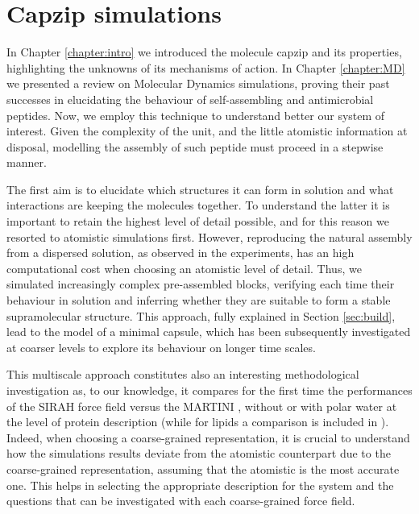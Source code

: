 \chapter{Capzip simulations} \label{chapter:capzip_results}

In Chapter \ref{chapter:intro} we introduced the molecule capzip and its properties, highlighting the unknowns of its mechanisms of action. In Chapter \ref{chapter:MD} we presented a review on Molecular Dynamics simulations, proving their past successes in elucidating the behaviour of self-assembling and antimicrobial peptides.
%
Now, we employ this technique to understand better our system of interest. Given the complexity of the unit, and the little atomistic information at disposal, modelling the assembly of such peptide must proceed in a stepwise manner.

The first aim is to elucidate which structures it can form in solution and what interactions are keeping the molecules together. To understand the latter it is important to retain the highest level of detail possible, and for this reason we resorted to atomistic simulations first.
%
However, reproducing the natural assembly from a dispersed solution, as observed in the experiments, has an high computational cost when choosing an atomistic level of detail.
%
Thus, we simulated increasingly complex pre-assembled blocks, verifying each time their behaviour in solution and inferring whether they are suitable to form a stable supramolecular structure. This approach, fully explained in Section \ref{sec:build}, lead to the model of a minimal capsule, which has been subsequently investigated at coarser levels to explore its behaviour on longer time scales.

This multiscale approach constitutes also an interesting methodological investigation as, to our knowledge, it compares for the first time the performances of the SIRAH force field \citep{Machado2018,Barrera2019} versus the MARTINI \citep{Marrink2007, Monticelli2008}, without or with polar water \citep{Yesylevskyy2010} at the level of protein description (while for lipids a comparison is included in \citet{Barrera2019}). Indeed, when choosing a coarse-grained representation, it is crucial to understand how the simulations results deviate from the atomistic counterpart due to the coarse-grained representation, assuming that the atomistic is the most accurate one. This helps in selecting the appropriate description for the system and the questions that can be investigated with each coarse-grained force field.

